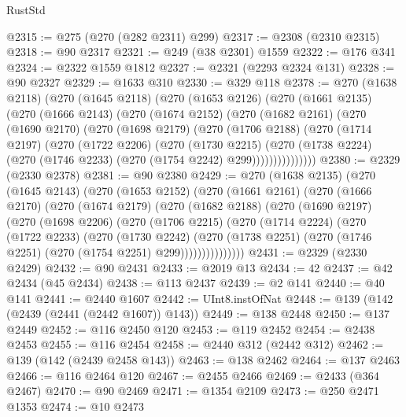 \begin{lexlean}{RustStd}
\begin{coremodule}
@2315 := @275 (@270 (@282 @2311) @299)
@2317 := @2308 (@2310 @2315)
@2318 := @90 @2317
@2321 := @249 (@38 @2301) @1559
@2322 := @176 @341
@2324 := @2322 @1559 @1812
@2327 := @2321 (@2293 @2324 @131)
@2328 := @90 @2327
@2329 := @1633 @310
@2330 := @329 @118
@2378 := @270
    (@1638 @2118)
    (@270
      (@1645 @2118)
      (@270
        (@1653 @2126)
        (@270
          (@1661 @2135)
          (@270
            (@1666 @2143)
            (@270
              (@1674 @2152)
              (@270
                (@1682 @2161)
                (@270
                  (@1690 @2170)
                  (@270
                    (@1698 @2179)
                    (@270
                      (@1706 @2188)
                      (@270
                        (@1714 @2197)
                        (@270
                          (@1722 @2206)
                          (@270
                            (@1730 @2215)
                            (@270
                              (@1738 @2224)
                              (@270 (@1746 @2233) (@270 (@1754 @2242) @299)))))))))))))))
@2380 := @2329 (@2330 @2378)
@2381 := @90 @2380
@2429 := @270
    (@1638 @2135)
    (@270
      (@1645 @2143)
      (@270
        (@1653 @2152)
        (@270
          (@1661 @2161)
          (@270
            (@1666 @2170)
            (@270
              (@1674 @2179)
              (@270
                (@1682 @2188)
                (@270
                  (@1690 @2197)
                  (@270
                    (@1698 @2206)
                    (@270
                      (@1706 @2215)
                      (@270
                        (@1714 @2224)
                        (@270
                          (@1722 @2233)
                          (@270
                            (@1730 @2242)
                            (@270
                              (@1738 @2251)
                              (@270 (@1746 @2251) (@270 (@1754 @2251) @299)))))))))))))))
@2431 := @2329 (@2330 @2429)
@2432 := @90 @2431
@2433 := @2019 @13
@2434 := 42
@2437 := @42 @2434 (@45 @2434)
@2438 := @113 @2437
@2439 := @2 @141
@2440 := @40 @141
@2441 := @2440 @1607
@2442 := UInt8.instOfNat
@2448 := @139 (@142 (@2439 (@2441 (@2442 @1607)) @143))
@2449 := @138 @2448
@2450 := @137 @2449
@2452 := @116 @2450 @120
@2453 := @119 @2452
@2454 := @2438 @2453
@2455 := @116 @2454
@2458 := @2440 @312 (@2442 @312)
@2462 := @139 (@142 (@2439 @2458 @143))
@2463 := @138 @2462
@2464 := @137 @2463
@2466 := @116 @2464 @120
@2467 := @2455 @2466
@2469 := @2433 (@364 @2467)
@2470 := @90 @2469
@2471 := @1354 @2109
@2473 := @250 @2471 @1353
@2474 := @10 @2473

\end{coremodule}
\end{lexlean}
